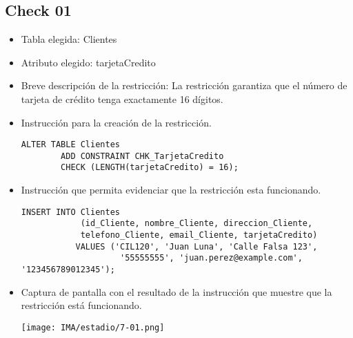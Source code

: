 \subsection*{Check 01}
\begin{itemize}
    \item Tabla elegida: Clientes
    \item Atributo elegido: tarjetaCredito
    \item Breve descripción de la restricción: La restricción garantiza que el número de tarjeta de crédito tenga exactamente 16 dígitos.
    \item Instrucción para la creación de la restricción.
    \begin{lstlisting}[caption={Tablas para la BdDatos}, label={lst:sql_estadios}]
    ALTER TABLE Clientes
        ADD CONSTRAINT CHK_TarjetaCredito 
        CHECK (LENGTH(tarjetaCredito) = 16);
    \end{lstlisting}
    
    \item Instrucción que permita evidenciar que la restricción esta funcionando.
    
    \begin{lstlisting}[caption={Tablas para la BdDatos}, label={lst:sql_estadios}]
    INSERT INTO Clientes 
            (id_Cliente, nombre_Cliente, direccion_Cliente, 
            telefono_Cliente, email_Cliente, tarjetaCredito)
           VALUES ('CIL120', 'Juan Luna', 'Calle Falsa 123',
                    '55555555', 'juan.perez@example.com', '123456789012345'); 
    \end{lstlisting}

    \item Captura de pantalla con el resultado de la instrucción que muestre que la restricción está
    funcionando.
    \begin{center}
        \texttt{[image: IMA/estadio/7-01.png]}
    \end{center}
\end{itemize}



